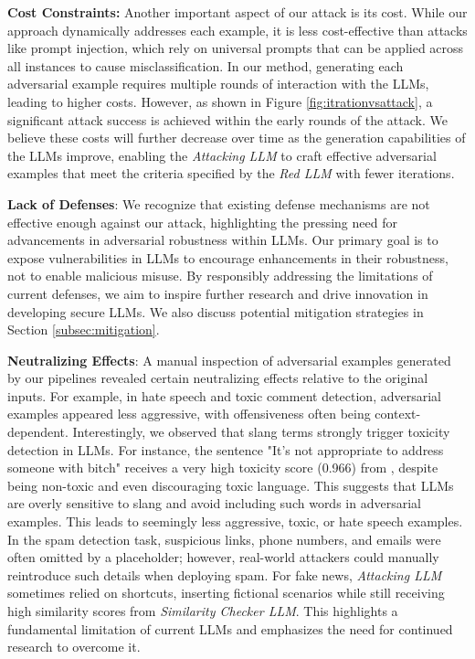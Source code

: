 \documentclass[11pt]{article}
\newcommand \attackingLLM[0]{\textsl{Attacking LLM}}
\newcommand \similarityCheckerLLM[0]{\textsl{Similarity Checker LLM}}
\begin{document}
\vspace{0.1cm}
\noindent \textbf{Cost Constraints:} Another important aspect of our attack is its cost. While our approach dynamically addresses each example, it is less cost-effective than attacks like prompt injection, which rely on universal prompts that can be applied across all instances to cause misclassification. In our method, generating each adversarial example requires multiple rounds of interaction with the LLMs, leading to higher costs. However, as shown in Figure \ref{fig:itrationvsattack}, a significant attack success is achieved within the early rounds of the attack. We believe these costs will further decrease over time as the generation capabilities of the LLMs improve, enabling the \textsl{Attacking LLM} to craft effective adversarial examples that meet the criteria specified by the \textsl{Red LLM} with fewer iterations.

\vspace{0.1cm}
\noindent \textbf{Lack of Defenses}: We recognize that existing defense mechanisms are not
effective enough against our attack, highlighting the pressing
need for advancements in adversarial robustness within LLMs.
Our primary goal is to expose vulnerabilities in LLMs to
encourage enhancements in their robustness, not to enable
malicious misuse. By responsibly addressing the limitations
of current defenses, we aim to inspire further research and
drive innovation in developing secure LLMs. We also discuss potential mitigation strategies in Section \ref{subsec:mitigation}.

\vspace{0.1cm}
\noindent \textbf{Neutralizing Effects}: A manual inspection of adversarial examples generated by our pipelines revealed certain neutralizing effects relative to the original inputs. For example, in hate speech and toxic comment detection, adversarial examples appeared less aggressive, with offensiveness often being context-dependent. Interestingly, we observed that slang terms strongly trigger toxicity detection in LLMs. For instance, the sentence "It's not appropriate to address someone with bitch" receives a very high toxicity score (0.966) from \cite{Detoxify}, despite being non-toxic and even discouraging toxic language. This suggests that LLMs are overly sensitive to slang and avoid including such words in adversarial examples. This leads to seemingly less aggressive, toxic, or hate speech examples. In the spam detection task, suspicious links, phone numbers, and emails were often omitted by a placeholder; however, real-world attackers could manually reintroduce such details when deploying spam. For fake news, \attackingLLM{} sometimes relied on shortcuts, inserting fictional scenarios while still receiving high similarity scores from \similarityCheckerLLM{}. This highlights a fundamental limitation of current LLMs and emphasizes the need for continued research to overcome it.
\end{document}
